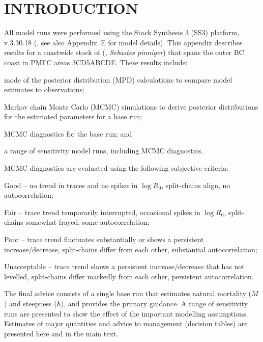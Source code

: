 \documentclass[11pt]{book}
\newcommand{\AppEqn}{Appendix~E}
\begin{document}
\section{INTRODUCTION}

All model runs were performed using the Stock Synthesis 3 (SS3) platform, v.3.30.18 (\citealt{Methot-etal:2021}, see also \AppEqn{} for model details).
This appendix describes results for a coastwide stock of \SPP{} (\SPC, \emph{Sebastes pinniger}) that spans the outer BC coast in PMFC areas 3CD5ABCDE.
These results include:
\vspace{-0.5\baselineskip}
\begin{itemize_csas}{}{}
\item mode of the posterior distribution (MPD) calculations to compare model estimates to observations;
\item Markov chain Monte Carlo (MCMC) simulations to derive posterior distributions for the estimated parameters for a base run;
\item MCMC diagnostics for the base run; and
\item a range of sensitivity model runs, including MCMC diagnostics.
\end{itemize_csas}
MCMC diagnostics are evaluated using the following subjective criteria:
\begin{itemize_csas}{}{}
  \item Good -- no trend in traces and no spikes in $\log R_0$, split-chains align, no autocorrelation;
  \item Fair -- trace trend temporarily interrupted, occasional spikes in $\log R_0$, split-chains somewhat frayed, some autocorrelation;
  \item Poor -- trace trend fluctuates substantially or shows a persistent increase/decrease, split-chains differ from each other, substantial autocorrelation;
  \item Unacceptable -- trace trend shows a persistent increase/decrease that has not levelled, split-chains differ markedly from each other, persistent autocorrelation.
\end{itemize_csas}

The final advice consists of a single base run that estimates natural mortality ($M$) and steepness ($h$), and provides the primary guidance.
A range of sensitivity runs are presented to show the effect of the important modelling assumptions.
Estimates of major quantities and advice to management (decision tables) are presented here and in the main text.
\end{document}
